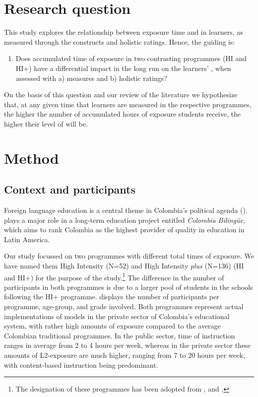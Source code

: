 \documentclass[output=paper]{langsci/langscibook}
\begin{document}
\section{Research question}

This study explores the relationship between  exposure time and  in  learners, as measured through the  constructs and holistic ratings. Hence, the guiding  is:  

\begin{enumerate}
\item Does accumulated time of  exposure in two contrasting  programmes (HI and HI+) have a differential impact in the long run on the learners’ , when assessed with a)  measures and b) holistic ratings? 
\end{enumerate}

On the basis of this question and our review of the literature we hypothesize that, at any given time that learners are measured in the respective programmes, the higher the number of accumulated hours of  exposure students receive, the higher their level of  will be.

\section{Method}

\subsection{Context and participants}

Foreign language education is a central theme in Colombia’s political agenda (\citealt{BonillaTejada2016}).  plays a major role in a long-term education project entitled \textit{Colombia Bilingüe}, which aims to rank Colombia as the highest provider of quality in education in  {Latin} America.   

Our study focussed on two  programmes with different total times of  exposure. We have named them High Intensity (N=52) and High Intensity \textit{plus} (N=136) (HI and HI+) for the purpose of the study.\footnote{The designation of these programmes has been adopted from \citet{CollinsEtAl1999,Bournot-Trites2007}, and \citet{CollinsWhite2011}.} The difference in the number of participants in both programmes is due to a larger pool of students in the schools following the HI+ programme.  displays the number of participants per programme, age-group, and grade involved. Both programmes represent actual implementations of  models in the private sector of Colombia’s educational system, with rather high amounts of  exposure compared to the average Colombian traditional  programmes. In the public sector, time of  instruction ranges in average from 2 to 4 hours per week, whereas in the private sector these amounts of L2-exposure are much higher, ranging from 7 to 20 hours per week, with  content-based instruction being predominant. 
\end{document}
